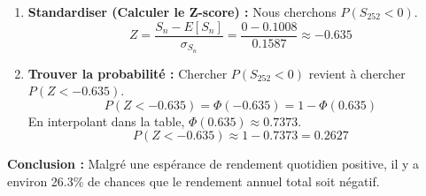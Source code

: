 \begin{examplebox}
\begin{enumerate}
    \item \textbf{Standardiser (Calculer le Z-score) :}
    Nous cherchons $P(S_{252} < 0)$.
    $$ Z = \frac{S_n - E[S_n]}{\sigma_{S_n}} = \frac{0 - 0.1008}{0.1587} \approx -0.635 $$
    
    \item \textbf{Trouver la probabilité :}
    Chercher $P(S_{252} < 0)$ revient à chercher $P(Z < -0.635)$.
    $$ P(Z < -0.635) = \Phi(-0.635) = 1 - \Phi(0.635) $$
    En interpolant dans la table, $\Phi(0.635) \approx 0.7373$.
    $$ P(Z < -0.635) \approx 1 - 0.7373 = 0.2627 $$
\end{enumerate}
\textbf{Conclusion :} Malgré une espérance de rendement quotidien positive, il y a environ 26.3\% de chances que le rendement annuel total soit négatif.
\end{examplebox}

